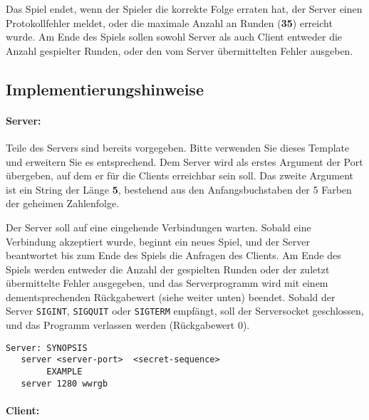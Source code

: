 \documentclass{article}
\begin{document}
Das Spiel endet, wenn der Spieler die korrekte Folge erraten hat, der Server
einen Protokollfehler meldet, oder die maximale Anzahl an Runden (\textbf{35})
erreicht wurde. Am Ende des Spiels sollen sowohl Server als auch Client
entweder die Anzahl gespielter Runden, oder den vom Server übermittelten
Fehler ausgeben.

\subsection*{Implementierungshinweise}
\label{sec:implhints}
\paragraph{Server:}
Teile des Servers sind bereits vorgegeben. Bitte verwenden Sie dieses Template und erweitern Sie es entsprechend.
Dem Server wird als erstes Argument der Port übergeben, auf dem er für die Clients
erreichbar sein soll. Das zweite Argument ist ein String der Länge \textbf{5},
bestehend aus den Anfangsbuchstaben der 5 Farben der geheimen Zahlenfolge.


Der Server soll auf eine eingehende Verbindungen warten. Sobald eine
Verbindung akzeptiert wurde, beginnt ein neues Spiel, und der Server
beantwortet bis zum Ende des Spiels die Anfragen des Clients. Am Ende des
Spiels werden entweder die Anzahl der gespielten Runden oder der zuletzt
übermittelte Fehler ausgegeben, und das Serverprogramm wird mit einem
dementsprechenden Rückgabewert (siehe weiter unten) beendet. Sobald der Server
\texttt{SIGINT}, \texttt{SIGQUIT} oder \texttt{SIGTERM} empfängt, soll der
Serversocket geschlossen, und das Programm verlassen werden (Rückgabewert 0).

\begin{verbatim}
Server: SYNOPSIS
   server <server-port>  <secret-sequence>
        EXAMPLE
   server 1280 wwrgb
\end{verbatim}

\paragraph{Client:}
\end{document}

